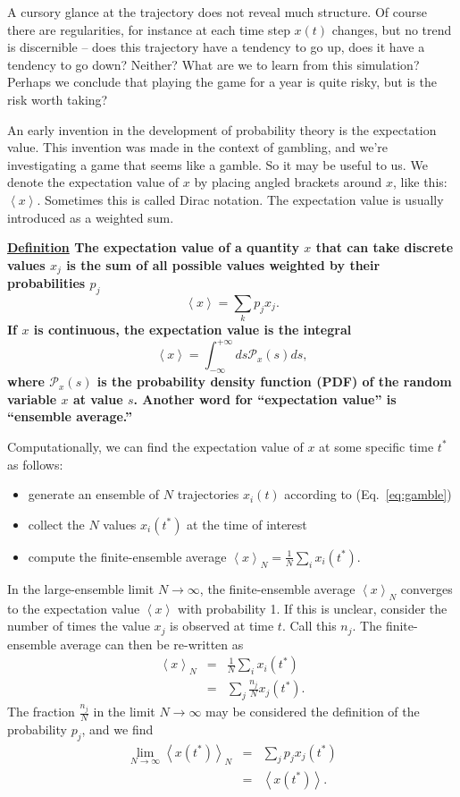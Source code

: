 \documentclass[a4paper]{article}
\newcommand{\ave}[1]{\left\langle#1 \right\rangle}
\newcommand{\PDF}{\mathcal{P}}
\newcommand{\eref}[1]{(Eq.~\ref{eq:#1})}
\newcommand{\be}{\begin{equation}}
\newcommand{\ee}{\end{equation}}
\newcommand{\bea}{\begin{eqnarray}}
\newcommand{\eea}{\end{eqnarray}}
\newcommand{\definition}[1]{\vspace{.2cm} {\bf \underline{Definition} #1} \vspace{.2cm}}
\begin{document}
A cursory glance at the trajectory does not reveal much structure. 
Of course there are regularities, for instance at each time step 
$x(t)$ changes, but no trend is discernible -- does this trajectory 
have a tendency to go up, does it have a tendency to go down? 
Neither? What are we to learn from this simulation? Perhaps we 
conclude that playing the game for a year is quite risky, but is the 
risk worth taking? 

An early invention in the development of probability theory is the 
expectation value. This invention was made in the 
context of gambling, and we're investigating a game that seems like a 
gamble. So it may be useful to us. We denote the expectation
value of $x$ by placing angled brackets around $x$, like this: $\ave{x}$. 
Sometimes this is called Dirac notation. The expectation value 
is usually introduced as a weighted sum.

\definition{The expectation value of a quantity $x$ 
that can take discrete values $x_j$ is the sum of all 
possible values weighted by their probabilities $p_j$
\be
\ave{x}=\sum_k p_j x_j.
\ee 
If $x$ is continuous, the expectation value is the integral
\be
\ave{x}=\int_{-\infty}^{+\infty} ds \PDF_x(s) ds,
\ee where $\PDF_x(s)$ is the probability density function (PDF)
of the random variable $x$ at value $s$. Another word for ``expectation value'' is
``ensemble average.''}

Computationally, we can find the expectation value of $x$ at some
specific time $t^*$ as follows:
\begin{itemize}
\item
generate an ensemble of $N$ trajectories 
$x_i(t)$ according to \eref{gamble}
\item
collect the $N$ values $x_i(t^*)$ at the time of interest
\item
compute the finite-ensemble average 
$\ave{x}_N=\frac{1}{N}\sum_i x_i(t^*)$.
\end{itemize}
In the large-ensemble limit $N\to\infty$, the finite-ensemble average 
$\ave{x}_N$ converges to the expectation value $\ave{x}$ with probability 1.
If this is unclear, consider the number of times
the value $x_j$ is observed at time $t$. Call this $n_j$. 
The finite-ensemble average can then be re-written as
\bea
\ave{x}_N&=&\frac{1}{N}\sum_i  x_i(t^*)\\
&=&\sum_j \frac{n_j}{N} x_j(t^*).
\eea
The fraction $\frac{n_j}{N}$ in the limit $N\to\infty$ may be
considered the definition of the probability $p_j$, and we find
\bea
\lim_{N\to\infty}\ave{x(t^*)}_N&=&\sum_j p_j x_j(t^*)\\
&=&\ave{x(t^*)}.
\eea
\end{document}

